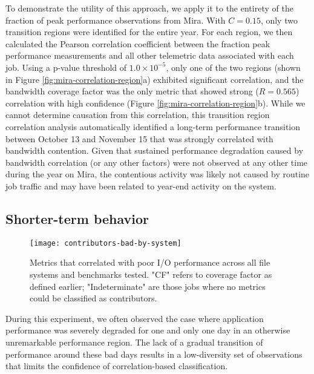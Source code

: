To demonstrate the utility of this approach, we apply it to the entirety of the fraction of peak performance observations from Mira.
With $C = 0.15$, only two transition regions were identified for the entire year.
For each region, we then calculated the Pearson correlation coefficient between the fraction peak performance measurements and all other telemetric data associated with each job.
Using a p-value threshold of ${1.0 \times 10^{-5}}$, only one of the two regions (shown in Figure \ref{fig:mira-correlation-region}a) exhibited significant correlation, and the bandwidth coverage factor was the only metric that showed strong (${R = 0.565}$) correlation with high confidence (Figure \ref{fig:mira-correlation-region}b).
While we cannot determine causation from this correlation, this transition region correlation analysis automatically identified a long-term performance transition between October 13 and November 15 that was strongly correlated with bandwidth contention.
Given that sustained performance degradation caused by bandwidth correlation (or any other factors) were not observed at any other time during the year on Mira, the contentious activity was likely not caused by routine job traffic and may have been related to year-end activity on the system.







\subsection{Shorter-term behavior} \label{sec:results/shortterm}

\begin{figure}[t]
    \centering
    \texttt{[image: contributors-bad-by-system]}
    \vspace{-.35in}
    \caption{Metrics that correlated with poor I/O performance across all file systems and benchmarks tested.  "CF" refers to coverage factor as defined earlier; "Indeterminate" are those jobs where no metrics could be classified as contributors.
    }
    \label{fig:contributors-bad-by-system}
\end{figure}

During this experiment, we often observed the case where application performance was severely degraded for one and only one day in an otherwise unremarkable performance region.  
The lack of a gradual transition of performance around these bad days results in a low-diversity set of observations that limits the confidence of correlation-based classification.

